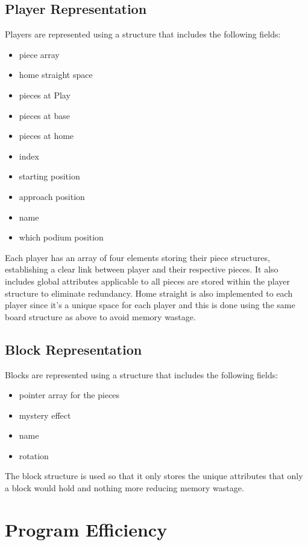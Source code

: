 \documentclass{article}
\begin{document}
\subsection{Player Representation}

Players are represented using a structure that includes the following fields:

\begin{itemize}
    \item piece array
    \item home straight space
    \item pieces at Play
    \item pieces at base
    \item pieces at home
    \item index
    \item starting position
    \item approach position
    \item name
    \item which podium position
\end{itemize}

Each player has an array of four elements storing their piece structures, establishing a clear link between player and their respective pieces. It also includes global attributes applicable to all pieces are stored within the player structure to eliminate redundancy. Home straight is also implemented to each player since it's a unique space for each player and this is done using the same board structure as above to avoid memory wastage.

\subsection{Block Representation}

Blocks are represented using a structure that includes the following fields:

\begin{itemize}
    \item pointer array for the pieces
    \item mystery effect
    \item name
    \item rotation
\end{itemize}

The block structure is used so that it only stores the unique attributes that only a block would hold and nothing more reducing memory wastage.

\section{Program Efficiency}
\end{document}
